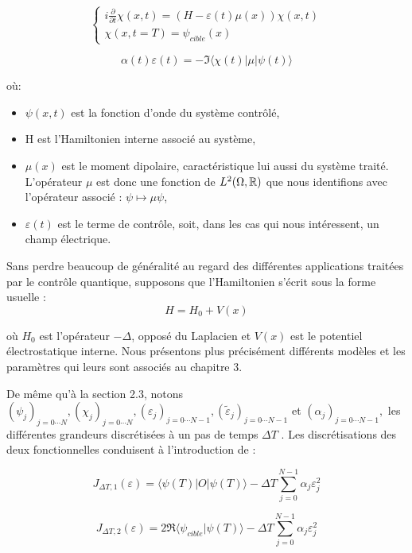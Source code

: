 \begin{equation}
\begin{cases}
i \frac{\partial}{\partial t} \chi (x,t) = (H - \varepsilon(t)\mu(x))\chi(x,t)\\
\chi(x,t=T)=\psi_{cible}(x)
\end{cases}
\end{equation}

\begin{equation}
\alpha(t)\varepsilon(t) = -\Im \langle \chi(t)|\mu|\psi(t)\rangle 
\end{equation}

où:
\begin{itemize}
	\item $\psi(x, t)$ est la fonction d'onde du système contrôlé,
	\item H est l'Hamiltonien interne associé au système,
	\item $\mu(x)$ est le moment dipolaire, caractéristique lui aussi du système traité. L'opérateur $\mu$ est donc une fonction de $L^2(\Omega, \mathbb R)$ que nous identifions avec l'opérateur associé : $\psi \mapsto \mu\psi$,
	\item $\varepsilon(t)$ est le terme de contrôle, soit, dans les cas qui nous intéressent, un champ
	électrique.
\end{itemize}

Sans perdre beaucoup de généralité au regard des différentes applications traitées par le contrôle quantique, supposons que l’Hamiltonien s'écrit sous la forme usuelle :
$$ H = H_0+V(x)$$

où $H_0$ est l'opérateur $-\Delta$, opposé du Laplacien et $V(x)$ est le potentiel électrostatique interne. Nous présentons plus précisément différents modèles et les paramètres qui leurs sont associés au chapitre 3.


De même qu'à la section 2.3, notons $(\psi_j)_{j = 0\cdots N}, (\chi_j)_{j = 0\cdots N}, (\varepsilon_j)_{j = 0\cdots N-1}, (\tilde{\varepsilon}_j)_{j = 0\cdots N-1}$ et $(\alpha_j)_{j = 0\cdots N-1},$ les différentes grandeurs discrétisées à un pas de temps $\Delta T$ . Les discrétisations des deux fonctionnelles conduisent à l'introduction de :

\begin{equation}
J_{\Delta T,1}(\varepsilon) = \langle \psi(T)|O|\psi(T)\rangle - \Delta T \sum_{j=0}^{N -1} \alpha_j\varepsilon_j^2
\end{equation}

\begin{equation}
J_{\Delta T,2}(\varepsilon) = 2\Re \langle \psi_{cible}|\psi(T)\rangle - \Delta T \sum_{j=0}^{N -1} \alpha_j\varepsilon_j^2
\end{equation}

